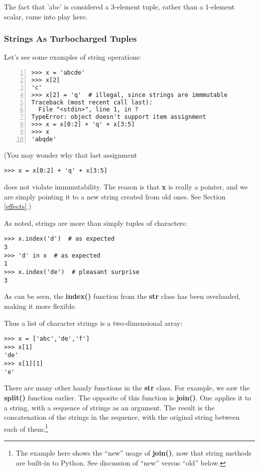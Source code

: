 The fact that 'abc' is considered a 3-element tuple, rather than a
1-element scalar, came into play here.

\subsubsection{Strings As Turbocharged Tuples}

Let's see some examples of string operations:

\begin{Verbatim}[fontsize=\relsize{-2},numbers=left]
>>> x = 'abcde'
>>> x[2]
'c'
>>> x[2] = 'q'  # illegal, since strings are immmutable
Traceback (most recent call last):
  File "<stdin>", line 1, in ?
TypeError: object doesn't support item assignment
>>> x = x[0:2] + 'q' + x[3:5]
>>> x
'abqde'
\end{Verbatim}

(You may wonder why that last assignment 

\begin{Verbatim}[fontsize=\relsize{-2}]
>>> x = x[0:2] + 'q' + x[3:5]
\end{Verbatim}

does not violate immmutability.  The reason is that {\bf x} is really a
pointer, and we are simply pointing it to a new string created from old
ones.  See Section \ref{effects}.)

As noted, strings are more than simply tuples of characters: 

\begin{Verbatim}[fontsize=\relsize{-2}]
>>> x.index('d')  # as expected
3
>>> 'd' in x  # as expected 
1
>>> x.index('de')  # pleasant surprise
3
\end{Verbatim}

As can be seen, the {\bf index()} function from the {\bf str} class
has been overloaded, making it more flexible. 

Thus a list of character strings is a two-dimensional array:

\begin{lstlisting}
>>> x = ['abc','de','f']
>>> x[1]
'de'
>>> x[1][1]
'e'
\end{lstlisting}

There are many other handy functions in the {\bf str} class.  For
example, we saw the {\bf split()} function earlier.  The opposite of
this function is {\bf join()}.  One applies it to a string, with a
sequence of strings as an argument.  The result is the concatenation of
the strings in the sequence, with the original string between each of
them:\footnote{The example here shows the ``new'' usage of {\bf join()},
now that string methods are built-in to Python.  See discussion of
``new'' versus ``old'' below.}


